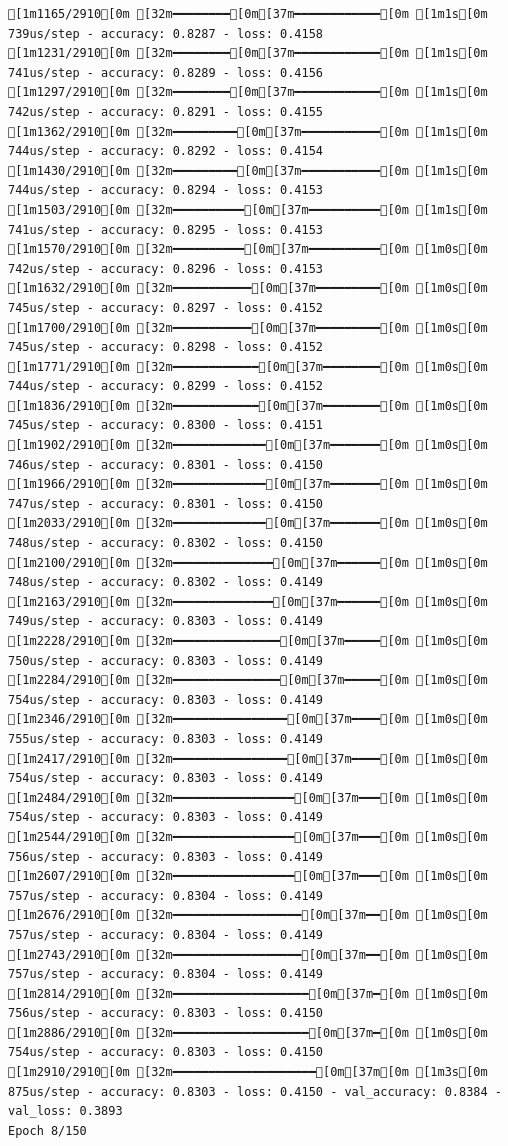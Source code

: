 \documentclass[
  letterpaper,
  DIV=11,
  numbers=noendperiod]{scrartcl}
\begin{document}
\begin{verbatim}
[1m1165/2910[0m [32m━━━━━━━━[0m[37m━━━━━━━━━━━━[0m [1m1s[0m 739us/step - accuracy: 0.8287 - loss: 0.4158
[1m1231/2910[0m [32m━━━━━━━━[0m[37m━━━━━━━━━━━━[0m [1m1s[0m 741us/step - accuracy: 0.8289 - loss: 0.4156
[1m1297/2910[0m [32m━━━━━━━━[0m[37m━━━━━━━━━━━━[0m [1m1s[0m 742us/step - accuracy: 0.8291 - loss: 0.4155
[1m1362/2910[0m [32m━━━━━━━━━[0m[37m━━━━━━━━━━━[0m [1m1s[0m 744us/step - accuracy: 0.8292 - loss: 0.4154
[1m1430/2910[0m [32m━━━━━━━━━[0m[37m━━━━━━━━━━━[0m [1m1s[0m 744us/step - accuracy: 0.8294 - loss: 0.4153
[1m1503/2910[0m [32m━━━━━━━━━━[0m[37m━━━━━━━━━━[0m [1m1s[0m 741us/step - accuracy: 0.8295 - loss: 0.4153
[1m1570/2910[0m [32m━━━━━━━━━━[0m[37m━━━━━━━━━━[0m [1m0s[0m 742us/step - accuracy: 0.8296 - loss: 0.4153
[1m1632/2910[0m [32m━━━━━━━━━━━[0m[37m━━━━━━━━━[0m [1m0s[0m 745us/step - accuracy: 0.8297 - loss: 0.4152
[1m1700/2910[0m [32m━━━━━━━━━━━[0m[37m━━━━━━━━━[0m [1m0s[0m 745us/step - accuracy: 0.8298 - loss: 0.4152
[1m1771/2910[0m [32m━━━━━━━━━━━━[0m[37m━━━━━━━━[0m [1m0s[0m 744us/step - accuracy: 0.8299 - loss: 0.4152
[1m1836/2910[0m [32m━━━━━━━━━━━━[0m[37m━━━━━━━━[0m [1m0s[0m 745us/step - accuracy: 0.8300 - loss: 0.4151
[1m1902/2910[0m [32m━━━━━━━━━━━━━[0m[37m━━━━━━━[0m [1m0s[0m 746us/step - accuracy: 0.8301 - loss: 0.4150
[1m1966/2910[0m [32m━━━━━━━━━━━━━[0m[37m━━━━━━━[0m [1m0s[0m 747us/step - accuracy: 0.8301 - loss: 0.4150
[1m2033/2910[0m [32m━━━━━━━━━━━━━[0m[37m━━━━━━━[0m [1m0s[0m 748us/step - accuracy: 0.8302 - loss: 0.4150
[1m2100/2910[0m [32m━━━━━━━━━━━━━━[0m[37m━━━━━━[0m [1m0s[0m 748us/step - accuracy: 0.8302 - loss: 0.4149
[1m2163/2910[0m [32m━━━━━━━━━━━━━━[0m[37m━━━━━━[0m [1m0s[0m 749us/step - accuracy: 0.8303 - loss: 0.4149
[1m2228/2910[0m [32m━━━━━━━━━━━━━━━[0m[37m━━━━━[0m [1m0s[0m 750us/step - accuracy: 0.8303 - loss: 0.4149
[1m2284/2910[0m [32m━━━━━━━━━━━━━━━[0m[37m━━━━━[0m [1m0s[0m 754us/step - accuracy: 0.8303 - loss: 0.4149
[1m2346/2910[0m [32m━━━━━━━━━━━━━━━━[0m[37m━━━━[0m [1m0s[0m 755us/step - accuracy: 0.8303 - loss: 0.4149
[1m2417/2910[0m [32m━━━━━━━━━━━━━━━━[0m[37m━━━━[0m [1m0s[0m 754us/step - accuracy: 0.8303 - loss: 0.4149
[1m2484/2910[0m [32m━━━━━━━━━━━━━━━━━[0m[37m━━━[0m [1m0s[0m 754us/step - accuracy: 0.8303 - loss: 0.4149
[1m2544/2910[0m [32m━━━━━━━━━━━━━━━━━[0m[37m━━━[0m [1m0s[0m 756us/step - accuracy: 0.8303 - loss: 0.4149
[1m2607/2910[0m [32m━━━━━━━━━━━━━━━━━[0m[37m━━━[0m [1m0s[0m 757us/step - accuracy: 0.8304 - loss: 0.4149
[1m2676/2910[0m [32m━━━━━━━━━━━━━━━━━━[0m[37m━━[0m [1m0s[0m 757us/step - accuracy: 0.8304 - loss: 0.4149
[1m2743/2910[0m [32m━━━━━━━━━━━━━━━━━━[0m[37m━━[0m [1m0s[0m 757us/step - accuracy: 0.8304 - loss: 0.4149
[1m2814/2910[0m [32m━━━━━━━━━━━━━━━━━━━[0m[37m━[0m [1m0s[0m 756us/step - accuracy: 0.8303 - loss: 0.4150
[1m2886/2910[0m [32m━━━━━━━━━━━━━━━━━━━[0m[37m━[0m [1m0s[0m 754us/step - accuracy: 0.8303 - loss: 0.4150
[1m2910/2910[0m [32m━━━━━━━━━━━━━━━━━━━━[0m[37m[0m [1m3s[0m 875us/step - accuracy: 0.8303 - loss: 0.4150 - val_accuracy: 0.8384 - val_loss: 0.3893
Epoch 8/150


\end{verbatim}
\end{document}
